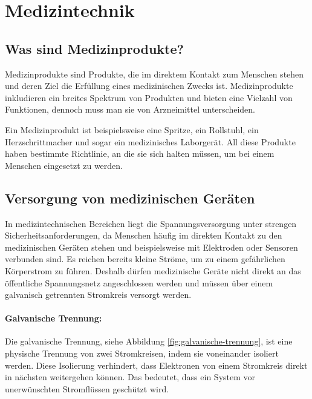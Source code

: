 \section[Medizintechnik]{Medizintechnik\authorlinda} \label{medizinischtechnisch}
\subsection[Was sind Medizinprodukte?]{Was sind Medizinprodukte?}
Medizinprodukte sind Produkte, die im direktem Kontakt zum Menschen stehen und deren Ziel die Erfüllung eines medizinischen Zwecks ist. Medizinprodukte inkludieren ein breites Spektrum von Produkten und bieten eine Vielzahl von Funktionen, dennoch muss man sie von Arzneimittel unterscheiden.

\noindent
Ein Medizinprodukt ist beispielsweise eine Spritze, ein Rollstuhl, ein Herzschrittmacher und sogar ein medizinisches Laborgerät. All diese Produkte haben bestimmte Richtlinie, an die sie sich halten müssen, 
um bei einem Menschen eingesetzt zu werden. \cite{ages_medizinprodukte} \cite{sozialministerium_medizinprodukte}

\subsection[Versorgung von medizinischen Geräten]{Versorgung von medizinischen Geräten}
In medizintechnischen Bereichen liegt die Spannungsversorgung unter strengen Sicherheitsanforderungen, da Menschen häufig im direkten Kontakt zu den medizinischen Geräten stehen und beispielsweise mit Elektroden oder Sensoren verbunden sind. Es reichen bereits kleine Ströme, um zu einem gefährlichen Körperstrom zu führen. Deshalb dürfen medizinische Geräte nicht direkt an das öffentliche Spannungsnetz angeschlossen werden und 
müssen über einem galvanisch getrennten Stromkreis versorgt werden. \cite{reichelt_galvanische_isolatoren} \cite{bender_stromversorgung}

\paragraph{Galvanische Trennung:}
Die galvanische Trennung, siehe Abbildung \ref{fig:galvanische-trennung}, ist eine physische Trennung von zwei Stromkreisen, indem sie voneinander isoliert werden. Diese Isolierung verhindert, dass Elektronen von einem Stromkreis direkt in nächsten weitergehen können. Das bedeutet, dass ein System vor unerwünschten Stromflüssen geschützt wird.

